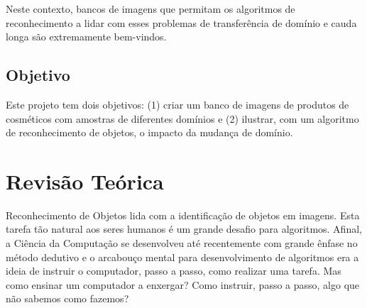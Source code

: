 \documentclass[conference]{IEEEtran}
\begin{document}
Neste contexto, bancos de imagens que permitam os algoritmos de reconhecimento a lidar com esses problemas de transferência de domínio e cauda longa são extremamente bem-vindos. 

\subsection{Objetivo}
Este projeto tem dois objetivos: (1) criar um banco de imagens de produtos de cosméticos com amostras de diferentes domínios e (2) ilustrar, com um algoritmo de reconhecimento de objetos, o impacto da mudança de domínio. 

\section{Revisão Teórica}


Reconhecimento de Objetos lida com a identificação de objetos em imagens. Esta tarefa tão natural aos seres humanos é um grande desafio para algoritmos. Afinal, a Ciência da Computação se desenvolveu até recentemente com grande ênfase no método dedutivo e o arcabouço mental para desenvolvimento de algoritmos era a ideia de instruir o computador, passo a passo, como realizar uma tarefa. Mas como ensinar um computador a enxergar? Como instruir, passo a passo, algo que não sabemos como fazemos?
\end{document}
